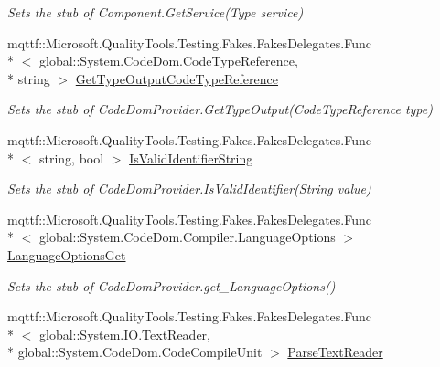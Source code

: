 \begin{DoxyCompactItemize}
\begin{DoxyCompactList}\small\item\em Sets the stub of Component.\-Get\-Service(\-Type service)\end{DoxyCompactList}\item 
mqttf\-::\-Microsoft.\-Quality\-Tools.\-Testing.\-Fakes.\-Fakes\-Delegates.\-Func\\*
$<$ global\-::\-System.\-Code\-Dom.\-Code\-Type\-Reference, \\*
string $>$ \hyperlink{class_microsoft_1_1_c_sharp_1_1_fakes_1_1_stub_c_sharp_code_provider_a394bd0229660a6961ae8d90f86c7e990}{Get\-Type\-Output\-Code\-Type\-Reference}
\begin{DoxyCompactList}\small\item\em Sets the stub of Code\-Dom\-Provider.\-Get\-Type\-Output(\-Code\-Type\-Reference type)\end{DoxyCompactList}\item 
mqttf\-::\-Microsoft.\-Quality\-Tools.\-Testing.\-Fakes.\-Fakes\-Delegates.\-Func\\*
$<$ string, bool $>$ \hyperlink{class_microsoft_1_1_c_sharp_1_1_fakes_1_1_stub_c_sharp_code_provider_a873d2ce77a7a06b21cec4ea66bd5a5dc}{Is\-Valid\-Identifier\-String}
\begin{DoxyCompactList}\small\item\em Sets the stub of Code\-Dom\-Provider.\-Is\-Valid\-Identifier(\-String value)\end{DoxyCompactList}\item 
mqttf\-::\-Microsoft.\-Quality\-Tools.\-Testing.\-Fakes.\-Fakes\-Delegates.\-Func\\*
$<$ global\-::\-System.\-Code\-Dom.\-Compiler.\-Language\-Options $>$ \hyperlink{class_microsoft_1_1_c_sharp_1_1_fakes_1_1_stub_c_sharp_code_provider_a8331d941a0643f6ae91388cd0cd3d129}{Language\-Options\-Get}
\begin{DoxyCompactList}\small\item\em Sets the stub of Code\-Dom\-Provider.\-get\-\_\-\-Language\-Options()\end{DoxyCompactList}\item 
mqttf\-::\-Microsoft.\-Quality\-Tools.\-Testing.\-Fakes.\-Fakes\-Delegates.\-Func\\*
$<$ global\-::\-System.\-I\-O.\-Text\-Reader, \\*
global\-::\-System.\-Code\-Dom.\-Code\-Compile\-Unit $>$ \hyperlink{class_microsoft_1_1_c_sharp_1_1_fakes_1_1_stub_c_sharp_code_provider_abd0cc5894598c18b57d971f87487ef5a}{Parse\-Text\-Reader}

\end{DoxyCompactItemize}
